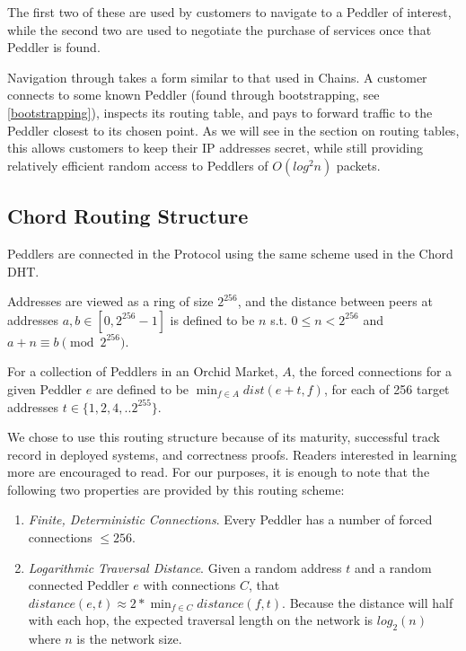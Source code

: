 The first two of these are used by customers to navigate to a Peddler
of interest, while the second two are used to negotiate the purchase
of services once that Peddler is found.

Navigation through \tOM{} takes a form similar to that used in
Chains. A customer connects to some known Peddler (found through
bootstrapping, see \ref{bootstrapping}), inspects its routing table,
and pays to forward traffic to the Peddler closest to its chosen
point. As we will see in the section on routing tables, this allows
customers to keep their IP addresses secret, while still providing
relatively efficient random access to Peddlers of $O(log^2 n)$ packets.

\subsection{Chord Routing Structure}


Peddlers are connected in the \Orchid{} Protocol using the same scheme
used in the Chord DHT.

Addresses are viewed as a ring of size $2^{256}$, and the distance
between peers at addresses $a, b \in [0, 2^{256}-1]$ is defined to be
$n$ s.t. $0 \leq n < 2^{256}$ and $a + n \equiv b \pmod{2^{256}}$.

For a collection of Peddlers in an Orchid Market, $A$, the forced
connections for a given Peddler $e$ are defined to be $\min_{f \in A}
dist(e+t, f)$, for each of 256 target addresses $t \in \{1, 2, 4,
.. 2^{255}\}$.

We chose to use this routing structure because of its maturity,
successful track record in deployed systems, and correctness
proofs. Readers interested in learning more are encouraged to
read\cite{CHORD}. For our purposes, it is enough to note that the
following two properties are provided by this routing scheme:

\begin{enumerate}
\item \emph{Finite, Deterministic Connections}. Every Peddler has a
  number of forced connections $\leq 256$.
\item \emph{Logarithmic Traversal Distance}. Given a random address
  $t$ and a random connected Peddler $e$ with connections $C$, that
  $distance(e, t) \approx 2 * \min_{f \in C} distance(f, t)$. Because
  the distance will half with each hop, the expected traversal length
  on the network is $log_2(n)$ where $n$ is the network size.
\end{enumerate}

